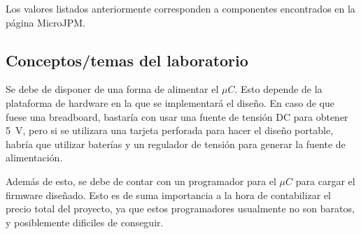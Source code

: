 Los valores listados anteriormente corresponden a componentes encontrados en la página MicroJPM.

\subsection{Conceptos/temas del laboratorio}

Se debe de disponer de una forma de alimentar el $\mu C$. 
Esto depende de la plataforma de hardware en la que se implementará el diseño.
En caso de que fuese una breadboard, bastaría con usar una fuente de tensión DC para obtener \SI{5}{V}, pero si se utilizara una tarjeta perforada para hacer el diseño portable, habría que utilizar baterías y un regulador de tensión para generar la fuente de alimentación.

Además de esto, se debe de contar con un programador para el $\mu C$ para cargar el firmware diseñado. 
Esto es de suma importancia a la hora de contabilizar el precio total del proyecto, ya que estos programadores usualmente no son baratos, y posiblemente dificiles de conseguir.


